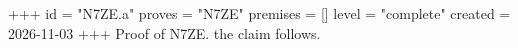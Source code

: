 +++
id = "N7ZE.a"
proves = "N7ZE"
premises = []
level = "complete"
created = 2026-11-03
+++
Proof of N7ZE. the claim follows.
